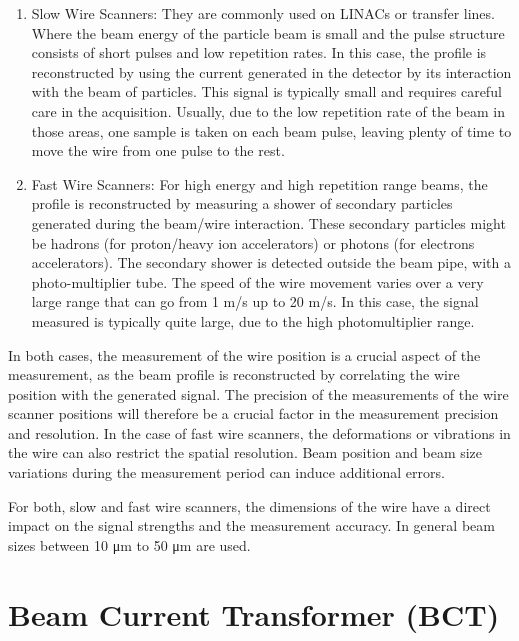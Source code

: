 \begin{enumerate}
    \item Slow Wire Scanners: They are commonly used on LINACs or transfer lines. Where the beam energy of the particle beam is small and the pulse structure consists of short pulses and low repetition rates. In this case, the profile is reconstructed by using the current generated in the detector by its interaction with the beam of particles. This signal is typically small and requires careful care in the acquisition. Usually, due to the low repetition rate of the beam in those areas, one sample is taken on each beam pulse, leaving plenty of time to move the wire from one pulse to the rest. 
    \item Fast Wire Scanners: For high energy and high repetition range beams, the profile is reconstructed by measuring a shower of secondary particles generated during the beam/wire interaction. These secondary particles might be hadrons (for proton/heavy ion accelerators) or photons (for electrons accelerators).  The secondary shower is detected outside the beam pipe, with a photo-multiplier tube. The speed of the wire movement varies over a very large range that can go from 1 \si[]{\metre /\second} up to 20 \si[]{\meter /\second}. In this case, the signal measured is typically quite large, due to the high photomultiplier range.  
\end{enumerate}

In both cases, the measurement of the wire position is a crucial aspect of the measurement, as the beam profile is reconstructed by correlating the wire position with the generated signal. The precision of the measurements of the wire scanner positions will therefore be a crucial factor in the measurement precision and resolution. In the case of fast wire scanners, the deformations or vibrations in the wire can also restrict the spatial resolution. Beam position and beam size variations during the measurement period can induce additional errors. 

For both, slow and fast wire scanners, the dimensions of the wire have a direct impact on the signal strengths and the measurement accuracy. In general beam sizes between 10 \si[]{\micro \metre} to 50 \si[]{\micro \metre}  are used.

\section{Beam Current Transformer (BCT)}
\label{sec:BCT}

